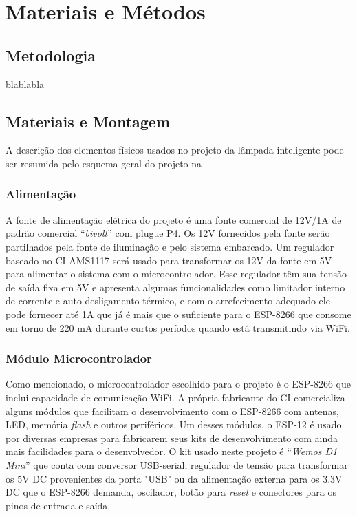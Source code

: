 \chapter{Materiais e Métodos}

\section{Metodologia}
blablabla

\section{Materiais e Montagem}

A descrição dos elementos físicos usados no projeto da lâmpada inteligente pode ser resumida pelo esquema geral do projeto na %


\subsection{Alimentação}

A fonte de alimentação elétrica do projeto é uma fonte comercial de 12V/1A de padrão comercial “\textit{bivolt}” com plugue P4. %
Os 12V fornecidos pela fonte serão partilhados pela fonte de iluminação e pelo sistema embarcado. Um regulador baseado no CI AMS1117 será usado para transformar os 12V da fonte em 5V para alimentar o sistema com o microcontrolador. Esse regulador têm sua tensão de saída fixa em 5V e apresenta algumas funcionalidades como limitador interno de corrente e auto-desligamento térmico, e com o arrefecimento adequado ele pode fornecer até 1A que já é mais que o suficiente para o ESP-8266 que consome em torno de 220 mA durante curtos períodos quando está transmitindo via WiFi.


\subsection{Módulo Microcontrolador}

Como mencionado, o microcontrolador escolhido para o projeto é o ESP-8266 que inclui capacidade de comunicação WiFi. A própria fabricante do CI comercializa alguns módulos que facilitam o desenvolvimento com o ESP-8266 com antenas, LED, memória \textit{flash} e outros periféricos. Um desses módulos, o ESP-12 é usado por diversas empresas para fabricarem seus kits de desenvolvimento com ainda mais facilidades para o desenvolvedor. O kit usado neste projeto é “\textit{Wemos D1 Mini}” %
que conta com conversor USB-serial, regulador de tensão para transformar os 5V DC provenientes da porta "USB" ou da alimentação externa para os 3.3V DC que o ESP-8266 demanda, oscilador, botão para \textit{reset} e conectores para os pinos de entrada e saída.

